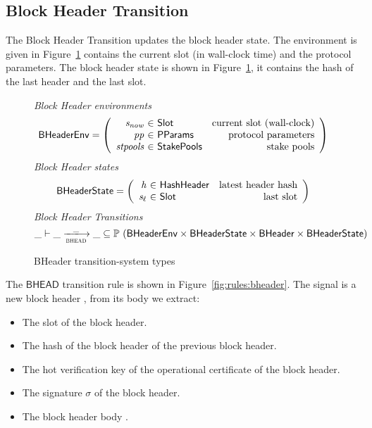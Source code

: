\subsection{Block Header Transition}
\label{sec:block-header-trans}

The Block Header Transition updates the block header state. The environment is
given in Figure~\ref{fig:ts-types:bheader} contains the current slot (in
wall-clock time) and the protocol parameters. The block header state is shown in
Figure~\ref{fig:ts-types:bheader}, it contains the hash of the last header and
the last slot.

\begin{figure}
  \emph{Block Header environments}
  \begin{equation*}
    \BHeaderEnv =
    \left(
      \begin{array}{r@{~\in~}lr}
        \var{s_{now}} & \Slot & \text{current slot (wall-clock)} \\
        \var{pp} & \PParams & \text{protocol parameters} \\
        \var{stpools} & \StakePools & \text{stake pools} \\
      \end{array}
    \right)
  \end{equation*}
  \emph{Block Header states}
  \begin{equation*}
    \BHeaderState =
    \left(
      \begin{array}{r@{~\in~}lr}
        \var{h} & \HashHeader & \text{latest header hash} \\
        \var{s_\ell} & \Slot & \text{last slot} \\
      \end{array}
    \right)
  \end{equation*}
  \emph{Block Header Transitions}
  \begin{equation*}
    \_ \vdash \var{\_} \trans{bhead}{\_} \var{\_} \subseteq
    \powerset (\BHeaderEnv \times \BHeaderState \times \BHeader \times \BHeaderState)
  \end{equation*}
  \caption{BHeader transition-system types}
  \label{fig:ts-types:bheader}
\end{figure}

The $\mathsf{BHEAD}$ transition rule is shown in
Figure~\ref{fig:rules:bheader}. The signal is a new block header , from
its body  we extract:

\begin{itemize}
\item The slot  of the block header.
\item The hash of the block header  of the previous block header.
\item The hot verification key  of the operational certificate of
  the block header.
\item The signature $\sigma$ of the block header.
\item The block header body .
\end{itemize}

